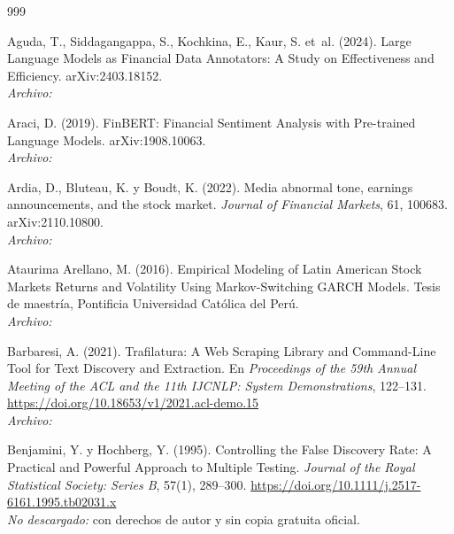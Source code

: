 \begin{thebibliography}{999}

Aguda, T., Siddagangappa, S., Kochkina, E., Kaur, S. et~al. (2024). Large Language Models as Financial Data Annotators: A Study on Effectiveness and Efficiency. arXiv:2403.18152.
\\\textit{Archivo:} 

Araci, D. (2019). {FinBERT}: Financial Sentiment Analysis with Pre-trained Language Models. arXiv:1908.10063.
\\\textit{Archivo:} 

Ardia, D., Bluteau, K. y Boudt, K. (2022). Media abnormal tone, earnings announcements, and the stock market. \emph{Journal of Financial Markets}, 61, 100683. arXiv:2110.10800.
\\\textit{Archivo:} 

Ataurima Arellano, M. (2016). Empirical Modeling of Latin American Stock Markets Returns and Volatility Using Markov-Switching GARCH Models. Tesis de maestría, Pontificia Universidad Católica del Perú.
\\\textit{Archivo:} 

Barbaresi, A. (2021). Trafilatura: A Web Scraping Library and Command-Line Tool for Text Discovery and Extraction. En \emph{Proceedings of the 59th Annual Meeting of the ACL and the 11th IJCNLP: System Demonstrations}, 122--131. \url{https://doi.org/10.18653/v1/2021.acl-demo.15}
\\\textit{Archivo:} 

Benjamini, Y. y Hochberg, Y. (1995). Controlling the False Discovery Rate: A Practical and Powerful Approach to Multiple Testing. \emph{Journal of the Royal Statistical Society: Series B}, 57(1), 289--300. \url{https://doi.org/10.1111/j.2517-6161.1995.tb02031.x}
\\\textit{No descargado:} con derechos de autor y sin copia gratuita oficial.


\end{thebibliography}
